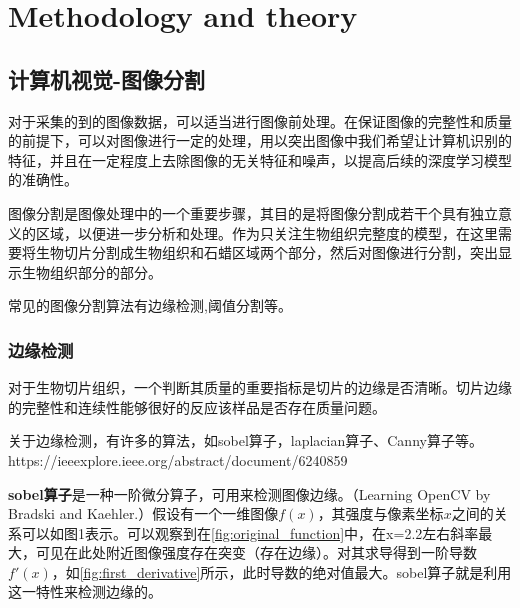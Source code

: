 \section{Methodology and theory}
\label{sec:problem_description}

\subsection{计算机视觉-图像分割}

对于采集的到的图像数据，可以适当进行图像前处理。在保证图像的完整性和质量的前提下，可以对图像进行一定的处理，用以突出图像中我们希望让计算机识别的特征，并且在一定程度上去除图像的无关特征和噪声，以提高后续的深度学习模型的准确性。

图像分割是图像处理中的一个重要步骤，其目的是将图像分割成若干个具有独立意义的区域，以便进一步分析和处理。作为只关注生物组织完整度的模型，在这里需要将生物切片分割成生物组织和石蜡区域两个部分，然后对图像进行分割，突出显示生物组织部分的部分。

常见的图像分割算法有边缘检测,阈值分割等。

\subsubsection{边缘检测}
对于生物切片组织，一个判断其质量的重要指标是切片的边缘是否清晰。切片边缘的完整性和连续性能够很好的反应该样品是否存在质量问题。

关于边缘检测，有许多的算法，如sobel算子，laplacian算子、Canny算子等。https://ieeexplore.ieee.org/abstract/document/6240859

\textbf{sobel算子}是一种一阶微分算子，可用来检测图像边缘。（Learning OpenCV by Bradski and Kaehler.）假设有一个一维图像$f(x)$，其强度与像素坐标$x$之间的关系可以如图1表示。可以观察到在\autoref{fig:original_function}中，在x=2.2左右斜率最大，可见在此处附近图像强度存在突变（存在边缘）。对其求导得到一阶导数$f'(x)$，如\autoref{fig:first_derivative}所示，此时导数的绝对值最大。sobel算子就是利用这一特性来检测边缘的。

